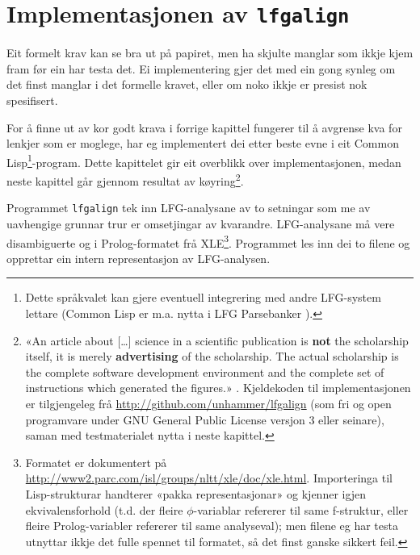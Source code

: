 \documentclass[12pt,a4paper,oneside,draft]{report}
\begin{document}
\chapter{Implementasjonen av \texttt{lfgalign}}
\label{sec-4}

\label{SEC:implementasjon}


Eit formelt krav kan se bra ut på papiret, men ha skjulte manglar som
ikkje kjem fram før ein har testa det.  Ei implementering gjer det med
ein gong synleg om det finst manglar i det formelle kravet, eller om
noko ikkje er presist nok spesifisert.

For å finne ut av kor godt krava i forrige kapittel fungerer til å
avgrense kva for lenkjer som er moglege, har eg implementert dei etter
beste evne i eit Common Lisp\footnote{Dette språkvalet kan gjere eventuell integrering med andre
        LFG-system lettare (Common Lisp er m.a. nytta i LFG
        Parsebanker \citep{rosen2009lpt}). }-program. Dette kapittelet gir eit
overblikk over implementasjonen, medan neste kapittel går gjennom
resultat av køyring\footnote{«An article about [\ldots{}] science in a scientific publication is
       \textbf{not} the scholarship itself, it is merely
       \textbf{advertising} of the scholarship. The actual scholarship
       is the complete software development environment and the
       complete set of instructions which generated the figures.»
       \citep[Jon Claerbout,~i][s.~7--8]{stodden2009err}. Kjeldekoden
       til implementasjonen er tilgjengeleg frå
       \href{http://github.com/unhammer/lfgalign}{http://github.com/unhammer/lfgalign} (som fri og open
       programvare under GNU General Public License versjon 3 eller
       seinare), saman med testmaterialet nytta i neste kapittel. }.

Programmet \texttt{lfgalign} tek inn LFG-analysane av to
setningar som me av uavhengige grunnar trur er omsetjingar av
kvarandre. LFG-analysane må vere disambiguerte og i Prolog-formatet
frå XLE\footnote{Formatet er dokumentert på
       \href{http://www2.parc.com/isl/groups/nltt/xle/doc/xle.html}{http://www2.parc.com/isl/groups/nltt/xle/doc/xle.html}. Importeringa
       til Lisp-strukturar handterer «pakka representasjonar» og
       kjenner igjen ekvivalensforhold (t.d. der fleire
       $\phi$-variablar refererer til same f-struktur, eller fleire
       Prolog-variabler refererer til same analyseval); men filene eg
       har testa utnyttar ikkje det fulle spennet til formatet, så det
       finst ganske sikkert feil. }. Programmet les inn dei to filene og opprettar ein
intern representasjon av LFG-analysen.  
\end{document}
